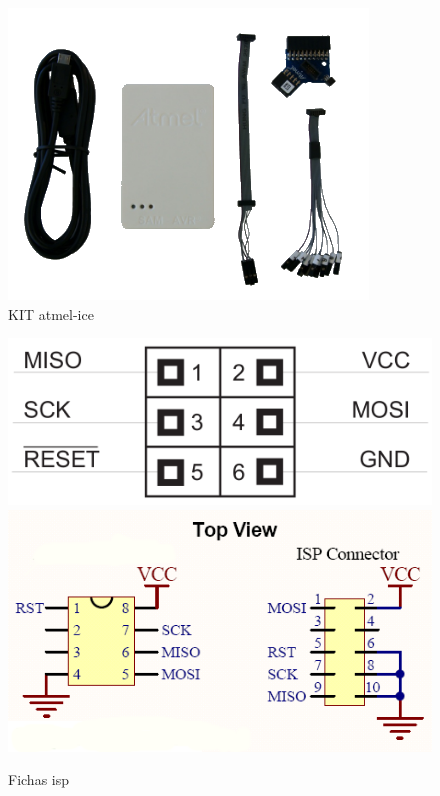 \begin{minipage}[!b]{.5\linewidth}
	\begin{figure}[H]
		\captionsetup{justification=raggedright,singlelinecheck=false}
		\flushleft
		\includegraphics[scale=0.75]{./image/PESTA/programador/Atmel_ice.png}
		\caption{KIT \acs{atmel-ice}}
		\label{Programador_1}
	\end{figure}
\end{minipage}
\hspace{.5cm}
\begin{minipage}[!b]{.5\linewidth}
	\begin{figure}[H]
		\captionsetup{justification=raggedright,singlelinecheck=false}
		\flushleft
		\includegraphics[scale=0.45]{./image/PESTA/programador/isp_6pin.png}
		\hspace{.3cm}
		\includegraphics[scale=0.5]{./image/PESTA/programador/isp_8e10pin.png}
		\caption{Fichas \acs{isp}}
		\label{ISP_6_8_10pin}
	\end{figure}
\end{minipage}
